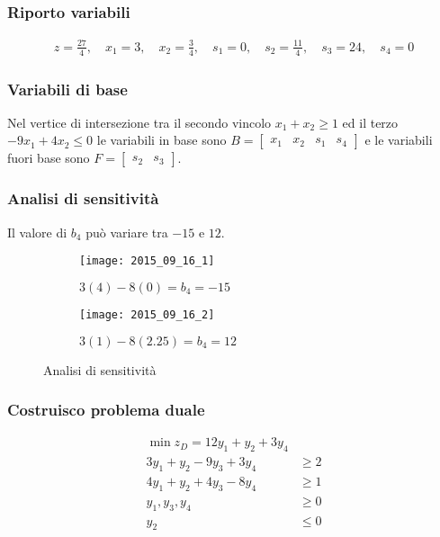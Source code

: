\documentclass[\main/main.tex]{subfiles}
\begin{document}
\subsubsection*{Riporto variabili}

\begin{align*}
  z   = \frac{27}{4}, \quad
  x_1 = 3           , \quad
  x_2 = \frac{3}{4} , \quad
  s_1 = 0           , \quad
  s_2 = \frac{11}{4}, \quad
  s_3 = 24          , \quad
  s_4 = 0
\end{align*}
\subsubsection*{Variabili di base}
Nel vertice di intersezione tra il secondo vincolo $x_1+x_2 \geq 1$ ed il terzo $-9x_1 + 4x_2 \leq 0$ le variabili in base sono $B = \begin{bmatrix}
    x_1 & x_2 & s_1 & s_4
  \end{bmatrix}$ e le variabili fuori base sono $F = \begin{bmatrix}
    s_2 & s_3
  \end{bmatrix}$.

\subsubsection*{Analisi di sensitività}
Il valore di $b_4$ può variare tra $-15$ e $12$.

\begin{figure}
  \begin{subfigure}{0.49\textwidth}
    \texttt{[image: 2015\_09\_16\_1]}
    \caption{$3(4)-8(0)= b_4 = -15$}
  \end{subfigure}
  \begin{subfigure}{0.49\textwidth}
    \texttt{[image: 2015\_09\_16\_2]}
    \caption{$3(1)-8(2.25)= b_4 = 12$}
  \end{subfigure}
  \caption{Analisi di sensitività}
\end{figure}

\subsubsection*{Costruisco problema duale}
\begin{align*}
  \min z_D = 12y_1 + y_2 + 3y_4    \\
  3y_1 + y_2 - 9y_3 +3y_4 & \geq 2 \\
  4y_1 + y_2 + 4y_3 -8y_4 & \geq 1 \\
  y_1, y_3, y_4           & \geq 0 \\
  y_2                     & \leq 0
\end{align*}
\end{document}
